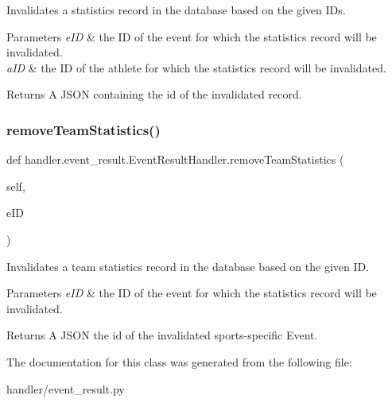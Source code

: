 Invalidates a statistics record in the database based on the given I\+Ds. 


\begin{DoxyParams}{Parameters}
{\em e\+ID} & the ID of the event for which the statistics record will be invalidated. \\
\hline
{\em a\+ID} & the ID of the athlete for which the statistics record will be invalidated.\\
\hline
\end{DoxyParams}
\begin{DoxyReturn}{Returns}
A J\+S\+ON containing the id of the invalidated record. 
\end{DoxyReturn}
\mbox{\label{classhandler_1_1event__result_1_1_event_result_handler_a0b856e2602fd0c998b3229bd96950471}} 
\subsubsection{\texorpdfstring{remove\+Team\+Statistics()}{removeTeamStatistics()}}
{\footnotesize\ttfamily def handler.\+event\+\_\+result.\+Event\+Result\+Handler.\+remove\+Team\+Statistics (\begin{DoxyParamCaption}\item[{}]{self,  }\item[{}]{e\+ID }\end{DoxyParamCaption})}



Invalidates a team statistics record in the database based on the given ID. 


\begin{DoxyParams}{Parameters}
{\em e\+ID} & the ID of the event for which the statistics record will be invalidated.\\
\hline
\end{DoxyParams}
\begin{DoxyReturn}{Returns}
A J\+S\+ON the id of the invalidated sports-\/specific Event. 
\end{DoxyReturn}


The documentation for this class was generated from the following file\+:\begin{DoxyCompactItemize}
\item 
handler/event\+\_\+result.\+py\end{DoxyCompactItemize}
